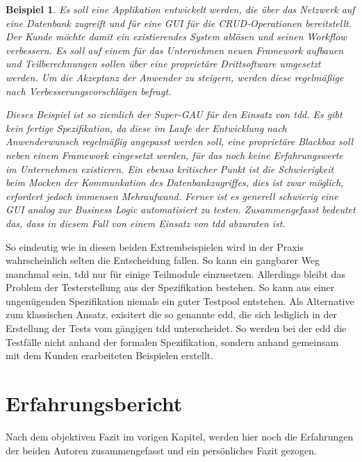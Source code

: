 \documentclass[a4paper,10pt]{scrartcl}
\newtheorem{beispiel}{Beispiel}[section]
\begin{document}
\begin{beispiel}
  \textit{Es soll eine Applikation entwickelt werden, die über das Netzwerk auf eine
  Datenbank zugreift und für eine GUI für die CRUD-Operationen bereitstellt. Der
  Kunde möchte damit ein existierendes System ablösen und seinen Workflow verbessern. Es
  soll auf einem für das Unternehmen neuen Framework aufbauen und Teilberechnungen sollen
  über eine proprietäre Drittsoftware umgesetzt werden. Um die Akzeptanz der Anwender zu
  steigern, werden diese regelmäßige nach Verbesserungsvorschlägen befragt.}

  Dieses Beispiel ist so ziemlich der Super-GAU für den Einsatz von \gls{tdd}. Es gibt
  kein fertige Spezifikation, da diese im Laufe der Entwicklung nach Anwenderwunsch
  regelmäßig angepasst werden soll, eine proprietäre Blackbox soll neben einem Framework
  eingesetzt werden, für das noch keine Erfahrungswerte im Unternehmen existieren. Ein
  ebenso kritischer Punkt ist die Schwierigkeit beim Mocken der Kommunkation des 
  Datenbankzugriffes, dies ist zwar möglich, erfordert jedoch immensen Mehraufwand.
  Ferner ist es generell schwierig eine GUI analog zur Business Logic automatisiert zu
  testen. Zusammengefasst bedeutet das, dass in diesem Fall von einem Einsatz von \gls{tdd}
  abzuraten ist.
\end{beispiel}

So eindeutig wie in diesen beiden Extrembeispielen wird in der Praxis wahrscheinlich selten 
die Entscheidung fallen. So kann ein gangbarer Weg manchmal sein, \gls{tdd} nur für einige
Teilmodule einzusetzen. Allerdings bleibt das Problem der Testerstellung aus der Spezifikation
bestehen. So kann aus einer ungenügenden Spezifikation niemals ein guter Testpool entstehen. Als
Alternative zum klassischen Ansatz, exisitert die so genannte \gls{edd},
die sich lediglich in der Erstellung der Tests vom gängigen \gls{tdd} unterscheidet. So werden
bei der \gls{edd} die Testfälle nicht anhand der formalen Spezifikation, sondern
anhand gemeinsam mit dem Kunden erarbeiteten Beispielen erstellt.

\section{Erfahrungsbericht}\label{Erfahrungsbericht}
Nach dem objektiven Fazit im vorigen Kapitel, werden hier noch die Erfahrungen
der beiden Autoren zusammengefasst und ein persönliches Fazit gezogen.
\end{document}

